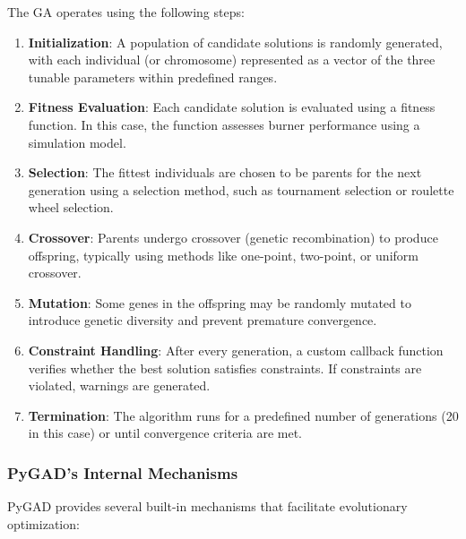 \documentclass[12pt]{report}
\begin{document}
The GA operates using the following steps:

\begin{enumerate}
    \item \textbf{Initialization}: A population of candidate solutions is randomly generated, with each individual (or chromosome) represented as a vector of the three tunable parameters within predefined ranges.
    \item \textbf{Fitness Evaluation}: Each candidate solution is evaluated using a fitness function. In this case, the function assesses burner performance using a simulation model.
    \item \textbf{Selection}: The fittest individuals are chosen to be parents for the next generation using a selection method, such as tournament selection or roulette wheel selection.
    \item \textbf{Crossover}: Parents undergo crossover (genetic recombination) to produce offspring, typically using methods like one-point, two-point, or uniform crossover.
    \item \textbf{Mutation}: Some genes in the offspring may be randomly mutated to introduce genetic diversity and prevent premature convergence.
    \item \textbf{Constraint Handling}: After every generation, a custom callback function verifies whether the best solution satisfies constraints. If constraints are violated, warnings are generated.
    \item \textbf{Termination}: The algorithm runs for a predefined number of generations (20 in this case) or until convergence criteria are met.
\end{enumerate}

\subsubsection{PyGAD's Internal Mechanisms}

PyGAD provides several built-in mechanisms that facilitate evolutionary optimization:
\end{document}
